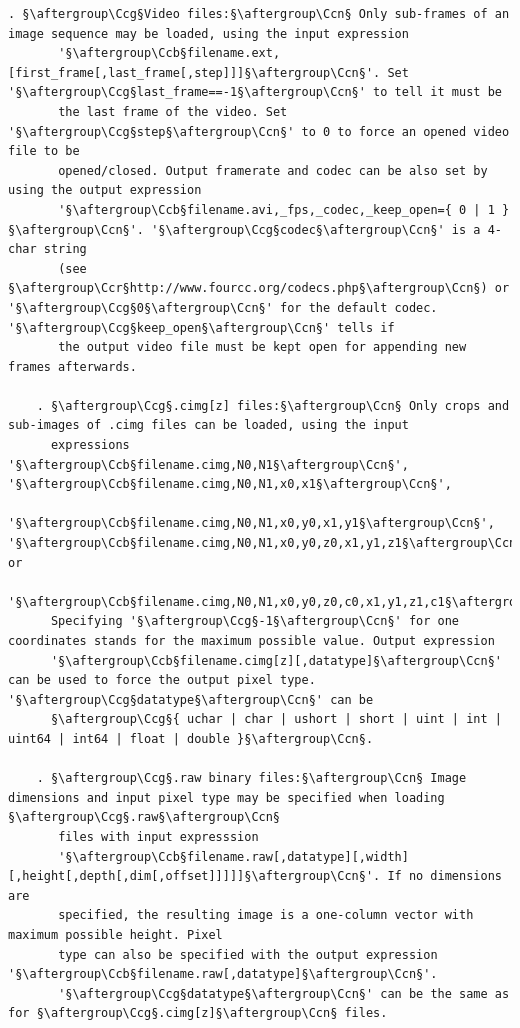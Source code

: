 \documentclass[a4paper,10.5pt,twoside]{book}
\def\Ccr{\color{ca}}
\def\Ccb{\color{cb}}
\def\Ccg{\color{cc}}
\def\Ccn{\color{black}}
\begin{document}
\begin{lstlisting}[escapechar=§]
    . §\aftergroup\Ccg§Video files:§\aftergroup\Ccn§ Only sub-frames of an image sequence may be loaded, using the input expression 
       '§\aftergroup\Ccb§filename.ext,[first_frame[,last_frame[,step]]]§\aftergroup\Ccn§'. Set '§\aftergroup\Ccg§last_frame==-1§\aftergroup\Ccn§' to tell it must be 
       the last frame of the video. Set '§\aftergroup\Ccg§step§\aftergroup\Ccn§' to 0 to force an opened video file to be 
       opened/closed. Output framerate and codec can be also set by using the output expression 
       '§\aftergroup\Ccb§filename.avi,_fps,_codec,_keep_open={ 0 | 1 }§\aftergroup\Ccn§'. '§\aftergroup\Ccg§codec§\aftergroup\Ccn§' is a 4-char string 
       (see §\aftergroup\Ccr§http://www.fourcc.org/codecs.php§\aftergroup\Ccn§) or '§\aftergroup\Ccg§0§\aftergroup\Ccn§' for the default codec. '§\aftergroup\Ccg§keep_open§\aftergroup\Ccn§' tells if 
       the output video file must be kept open for appending new frames afterwards. 
 
    . §\aftergroup\Ccg§.cimg[z] files:§\aftergroup\Ccn§ Only crops and sub-images of .cimg files can be loaded, using the input 
      expressions '§\aftergroup\Ccb§filename.cimg,N0,N1§\aftergroup\Ccn§', '§\aftergroup\Ccb§filename.cimg,N0,N1,x0,x1§\aftergroup\Ccn§', 
      '§\aftergroup\Ccb§filename.cimg,N0,N1,x0,y0,x1,y1§\aftergroup\Ccn§', '§\aftergroup\Ccb§filename.cimg,N0,N1,x0,y0,z0,x1,y1,z1§\aftergroup\Ccn§' or 
      '§\aftergroup\Ccb§filename.cimg,N0,N1,x0,y0,z0,c0,x1,y1,z1,c1§\aftergroup\Ccn§'. 
      Specifying '§\aftergroup\Ccg§-1§\aftergroup\Ccn§' for one coordinates stands for the maximum possible value. Output expression 
      '§\aftergroup\Ccb§filename.cimg[z][,datatype]§\aftergroup\Ccn§' can be used to force the output pixel type. '§\aftergroup\Ccg§datatype§\aftergroup\Ccn§' can be 
      §\aftergroup\Ccg§{ uchar | char | ushort | short | uint | int | uint64 | int64 | float | double }§\aftergroup\Ccn§. 
 
    . §\aftergroup\Ccg§.raw binary files:§\aftergroup\Ccn§ Image dimensions and input pixel type may be specified when loading §\aftergroup\Ccg§.raw§\aftergroup\Ccn§ 
       files with input expresssion 
       '§\aftergroup\Ccb§filename.raw[,datatype][,width][,height[,depth[,dim[,offset]]]]]§\aftergroup\Ccn§'. If no dimensions are 
       specified, the resulting image is a one-column vector with maximum possible height. Pixel 
       type can also be specified with the output expression '§\aftergroup\Ccb§filename.raw[,datatype]§\aftergroup\Ccn§'. 
       '§\aftergroup\Ccg§datatype§\aftergroup\Ccn§' can be the same as for §\aftergroup\Ccg§.cimg[z]§\aftergroup\Ccn§ files. 
 

\end{lstlisting}
\end{document}
